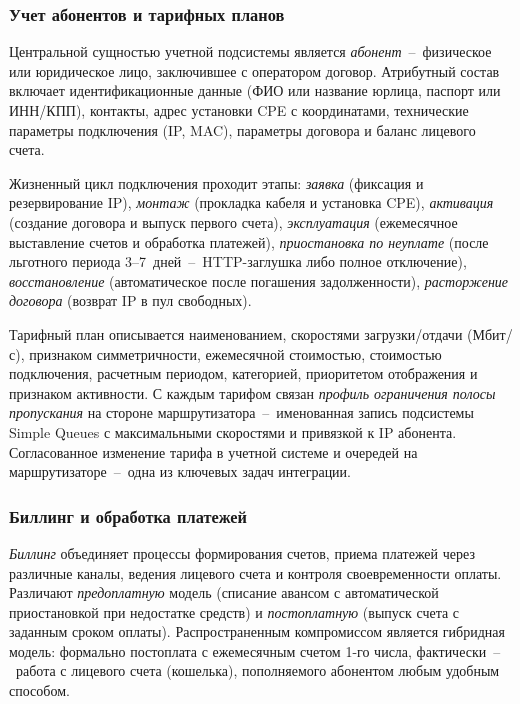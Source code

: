 \subsubsection{Учет абонентов и тарифных планов}

Центральной сущностью учетной подсистемы является \emph{абонент}~--~физическое или юридическое лицо, заключившее с оператором договор. Атрибутный состав включает идентификационные данные (ФИО или название юрлица, паспорт или ИНН/КПП), контакты, адрес установки CPE с координатами, технические параметры подключения (IP, MAC), параметры договора и баланс лицевого счета.

Жизненный цикл подключения проходит этапы: \emph{заявка} (фиксация и резервирование IP), \emph{монтаж} (прокладка кабеля и установка CPE), \emph{активация} (создание договора и выпуск первого счета), \emph{эксплуатация} (ежемесячное выставление счетов и обработка платежей), \emph{приостановка по неуплате} (после льготного периода 3--7~дней~--~HTTP-заглушка либо полное отключение), \emph{восстановление} (автоматическое после погашения задолженности), \emph{расторжение договора} (возврат IP в пул свободных).

Тарифный план описывается наименованием, скоростями загрузки/отдачи (Мбит/с), признаком симметричности, ежемесячной стоимостью, стоимостью подключения, расчетным периодом, категорией, приоритетом отображения и признаком активности. С каждым тарифом связан \emph{профиль ограничения полосы пропускания} на стороне маршрутизатора~--~именованная запись подсистемы Simple Queues с максимальными скоростями и привязкой к IP абонента. Согласованное изменение тарифа в учетной системе и очередей на маршрутизаторе~--~одна из ключевых задач интеграции.

\subsubsection{Биллинг и обработка платежей}

\emph{Биллинг} объединяет процессы формирования счетов, приема платежей через различные каналы, ведения лицевого счета и контроля своевременности оплаты. Различают \emph{предоплатную} модель (списание авансом с автоматической приостановкой при недостатке средств) и \emph{постоплатную} (выпуск счета с заданным сроком оплаты). Распространенным компромиссом является гибридная модель: формально постоплата с ежемесячным счетом 1-го числа, фактически~--~работа с лицевого счета (кошелька), пополняемого абонентом любым удобным способом.


